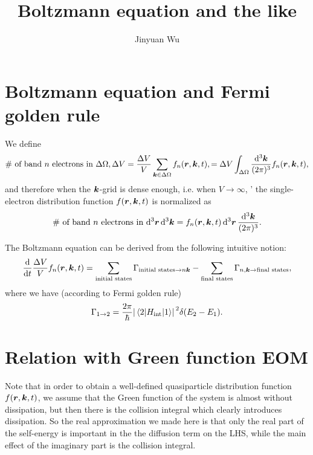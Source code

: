 \documentclass[hyperref, a4paper]{article}
\title{Boltzmann equation and the like}
\author{Jinyuan Wu}
\begin{document}
\maketitle

\section{Boltzmann equation and Fermi golden rule}

We define
\[
    \text{\# of band $n$ electrons in $\Delta \Omega, \Delta V$}
    = \frac{\Delta V}{V} \sum_{\vb*{k} \in \Delta \Omega} f_{n} (\vb*{r}, \vb*{k}, t),
    = \Delta V \int_{\Delta \Omega} \frac{\dd[3]{\vb*{k}}}{(2\pi)^3} f_n (\vb*{r}, \vb*{k}, t),
\]
and therefore when the $\vb*{k}$-grid is dense enough, i.e. when $V \to \infty$, '
the single-electron distribution function $f(\vb*{r}, \vb*{k}, t)$ is 
normalized as
\begin{equation}
    \text{\# of band $n$ electrons in $\dd[3]{\vb*{r}} \dd[3]{\vb*{k}}$} 
    = f_n(\vb*{r}, \vb*{k}, t) \dd[3]{\vb*{r}} \frac{\dd[3]{\vb*{k}}}{(2\pi)^3}.
\end{equation}

The Boltzmann equation can be derived from the following intuitive notion:
\[
    \dv{t} \frac{\Delta V}{V} f_n (\vb*{r}, \vb*{k}, t) 
    = \sum_{\text{initial states}} \Gamma_{\text{initial states} \to n \vb*{k}} 
    - \sum_{\text{final states}} \Gamma_{n, \vb*{k} \to \text{final states}} ,
\]
where we have (according to Fermi golden rule)
\begin{equation}
    \Gamma_{1 \to 2} = \frac{2\pi}{\hbar} 
    \abs*{\mel{2}{H_{\text{int}}}{1}}^2 
    \delta(E_2 - E_1).
\end{equation}

\section{Relation with Green function EOM}

Note that in order to obtain a well-defined 
quasiparticle distribution function $f(\vb*{r}, \vb*{k}, t)$,
we assume that the Green function of the system 
is almost without dissipation,
but then there is the collision integral
which clearly introduces dissipation. 
So the real approximation we made here is that
only the real part of the self-energy 
is important in the the diffusion term on the LHS, 
while the main effect of the imaginary part is the collision integral.
\end{document}
